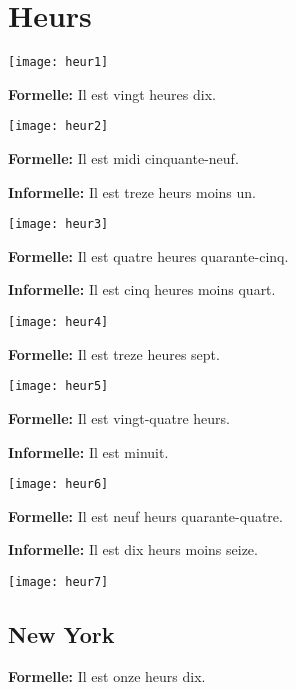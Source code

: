 \section{Heurs}

\begin{center}
    \texttt{[image: heur1]}
\end{center}

\textbf{Formelle:} Il est vingt heures dix.

\begin{center}
\texttt{[image: heur2]}
\end{center}

\textbf{Formelle:} Il est midi cinquante-neuf.

\textbf{Informelle:} Il est treze heurs moins un.

\begin{center}
    \texttt{[image: heur3]}
\end{center}

\textbf{Formelle:} Il est quatre heures quarante-cinq.

\textbf{Informelle:} Il est cinq heures moins quart.

\begin{center}
    \texttt{[image: heur4]}
\end{center}

\textbf{Formelle:} Il est treze heures sept.

\begin{center}
    \texttt{[image: heur5]}
\end{center}

\textbf{Formelle:} Il est vingt-quatre heurs.

\textbf{Informelle:} Il est minuit. 

\begin{center}
    \texttt{[image: heur6]}
\end{center}

\textbf{Formelle:} Il est neuf heurs quarante-quatre.

\textbf{Informelle:} Il est dix heurs moins seize.

\begin{center}
    \texttt{[image: heur7]}
\end{center}

\subsection*{New York}

\textbf{Formelle:} Il est onze heurs dix.


